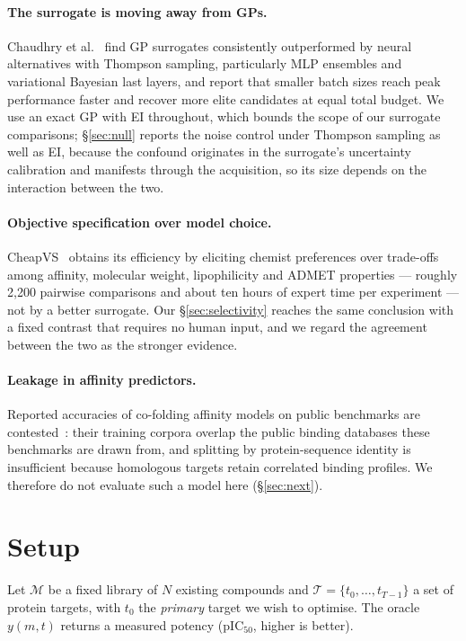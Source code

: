 \documentclass[11pt]{article}
\begin{document}
\paragraph{The surrogate is moving away from GPs.} Chaudhry et al.~\cite{chaudhry2026practical} find GP
surrogates consistently outperformed by neural alternatives with Thompson
sampling, particularly MLP ensembles and variational Bayesian last layers, and
report that smaller batch sizes reach peak performance faster and recover more
elite candidates at equal total budget. We use an exact GP with EI throughout,
which bounds the scope of our surrogate comparisons; \S\ref{sec:null} reports
the noise control under Thompson sampling as well as EI, because the
confound originates in the surrogate's uncertainty calibration and manifests
through the acquisition, so its size depends on the interaction between the
two.

\paragraph{Objective specification over model choice.} CheapVS~\cite{dang2025cheapvs} obtains its
efficiency by eliciting chemist preferences over trade-offs among affinity,
molecular weight, lipophilicity and ADMET properties --- roughly 2{,}200
pairwise comparisons and about ten hours of expert time per experiment --- not
by a better surrogate. Our \S\ref{sec:selectivity} reaches the same conclusion
with a fixed contrast that requires no human input, and we regard the agreement
between the two as the stronger evidence.

\paragraph{Leakage in affinity predictors.} Reported accuracies of co-folding
affinity models on public benchmarks are contested~\cite{boltz2_prereview,leakage2026}: their training corpora
overlap the public binding databases these benchmarks are drawn from, and
splitting by protein-sequence identity is insufficient because homologous
targets retain correlated binding profiles. We therefore do not evaluate such a
model here (\S\ref{sec:next}).

\section{Setup}

Let $\mathcal{M}$ be a fixed library of $N$ existing compounds and
$\mathcal{T} = \{t_0, \ldots, t_{T-1}\}$ a set of protein targets, with $t_0$
the \emph{primary} target we wish to optimise. The oracle $y(m, t)$ returns a
measured potency (pIC$_{50}$, higher is better).
\end{document}
